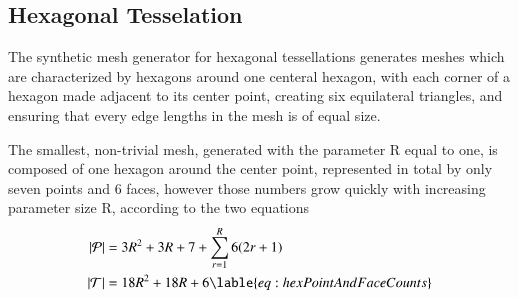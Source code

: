 

%
%
%
%

%
%
%
%
\pagebreak
\subsection{Hexagonal Tesselation}
The synthetic mesh generator for hexagonal tessellations generates meshes which are characterized by hexagons around one centeral hexagon, with each corner of a hexagon made adjacent to its center point, creating six equilateral triangles, and ensuring that every edge lengths in the mesh is of equal size.

The smallest, non-trivial mesh, generated with the parameter R equal to one, is composed of one hexagon around the center point, represented in total by only seven points and 6 faces, however those numbers grow quickly
with increasing parameter size R, according to the two equations
\begin{align}
	|\bP| &= 3R^2 + 3R + 7 +\sum_{r=1}^R{6(2r + 1)}\\
	|\bT| &= 18R^2 + 18R + 6
	\lable{eq:hexPointAndFaceCounts}
\end{align}


